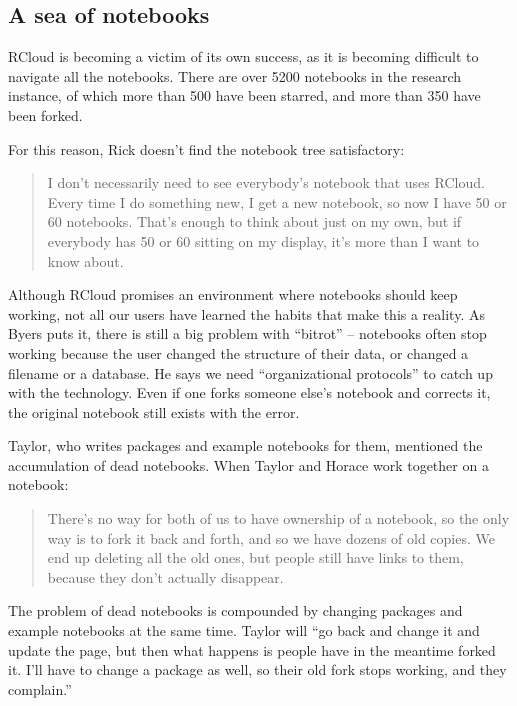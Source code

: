 \subsection{A sea of notebooks}
RCloud is becoming a victim of its own success, as it is becoming
difficult to navigate all the notebooks.  There are over 5200 notebooks in
the research instance, of which more than 500 have been starred, and more
than 350 have been forked.

For this reason, Rick doesn't find the notebook tree satisfactory:
\begin{quote}
I don't necessarily need to see everybody's notebook that uses RCloud. Every
time I do something new, I get a new notebook, so now I have 50 or 60 notebooks.
That's enough to think about just on my own, but if everybody has
50 or 60 sitting on my display, it's more than I want to know about.
\end{quote}

Although RCloud promises an environment where notebooks should keep working,
not all our users have learned the habits that make this a reality. As Byers
puts it, there is still a big problem with ``bitrot'' -- notebooks often
stop working because the user changed the structure of their data, or
changed a filename or a database.  He says we need ``organizational
protocols'' to catch up with the technology. Even if one forks someone
else's notebook and corrects it, the original notebook still exists with
the error.


Taylor, who writes packages and example notebooks for them, mentioned the
accumulation of dead notebooks. When Taylor and Horace work together on a notebook:
\begin{quote}
There's no way for both of us to have ownership of a notebook, so the only
way is to fork it back and forth, and so we have dozens of old copies. We
end up deleting all the old ones, but people still have links to them,
because they don't actually disappear.
\end{quote}

The problem of dead notebooks is compounded by changing
packages and example notebooks at the same time. Taylor will ``go back and
change it and update the page, but then what happens is people have in the
meantime forked it. I'll have to change a package as well, so their
old fork stops working, and they complain.''

